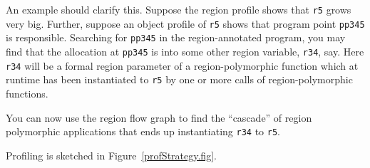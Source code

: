 \documentclass[12pt]{book}
\begin{document}
An example should clarify this. Suppose the region profile shows that
\texttt{r5} grows very big. Further, suppose an object profile of
\texttt{r5} shows that program point \texttt{pp345} is responsible.
Searching for \texttt{pp345} in the region-annotated program, you may find
that the allocation at \texttt{pp345} is into some other region variable,
\texttt{r34}, say. Here \texttt{r34} will be a formal region parameter of a
region-polymorphic function which at runtime has been instantiated to
\texttt{r5} by one or more calls of region-polymorphic functions.

You can now use the region flow graph to find the ``cascade'' of region
polymorphic applications that ends up instantiating \texttt{r34} to
\texttt{r5}.

Profiling is sketched in Figure~\ref{profStrategy.fig}.

\newcommand{\picbox}[1]{\framebox(5,3){\scriptsize{\parbox{22mm}{\begin{center}
        #1 \end{center}}}}}
\newcommand{\vectorr}[1]{\vector(1,0){1}
  \makebox(-1,1)[t]{\scriptsize{#1}}}
\end{document}
